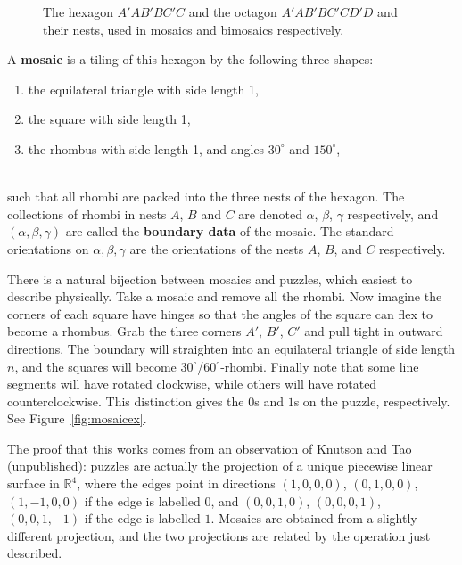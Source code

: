 \documentclass[12pt]{article}
\newcommand{\RR}{\mathbb{R}}
\begin{document}
%
\begin{figure}[htbp]
\begin{center}
\caption{The hexagon $A'AB'BC'C$ and the octagon $A'AB'BC'CD'D$
and their nests, used in mosaics and bimosaics respectively.} 
\label{fig:hexoct}
\end{center}
\end{figure}
%

A {\bf mosaic} is a tiling of this hexagon by the following three shapes:
\\
\parbox{3.5in}{
\begin{enumerate}
\item[(a)] the equilateral triangle with side length 1,
\item[(b)] the square with side length 1,
\item[(c)] the rhombus with side length 1, and 
angles $30^\circ$ and $150^\circ$,
\end{enumerate}
}\hspace{.5in}
\parbox{1.2in}{
}
\\
such that all rhombi are packed into the three nests of the hexagon.
The collections of rhombi in nests $A$, $B$ and $C$ are denoted 
$\alpha$, $\beta$, $\gamma$ respectively, and  $(\alpha, \beta, \gamma)$ 
are called the {\bf boundary data} of the mosaic.
The standard orientations on $\alpha, \beta, \gamma$ are the
orientations of the nests $A$, $B$, and $C$ respectively.

There is a natural bijection between mosaics and puzzles, which easiest
to describe physically.  Take a mosaic
and remove all the rhombi.  Now imagine the corners of each square have hinges
so that the angles of the square can flex to become a rhombus.  Grab the 
three corners $A'$, $B'$, $C'$ and pull tight in outward directions.  
The boundary will straighten into an equilateral
triangle of side length $n$, and the squares will become 
$30^\circ$/$60^\circ$-rhombi.  Finally note that some line segments 
will have rotated clockwise, while others will have rotated 
counterclockwise.
This distinction gives the $0$s and $1$s on the puzzle, respectively.
See Figure~\ref{fig:mosaicex}.

The proof that this works comes from an observation of Knutson and 
Tao (unpublished): puzzles 
are actually the projection of a unique piecewise linear surface in 
$\RR^4$, where
the edges point in directions
$(1,0,0,0)$, $(0,1,0,0)$, $(1,-1,0,0)$ if the edge is labelled $0$,
and
$(0,0,1,0)$, $(0,0,0,1)$, $(0,0,1,-1)$ if the edge is labelled $1$.
Mosaics are obtained from a slightly different projection, and the
two projections are related by the operation just described.
\end{document}
